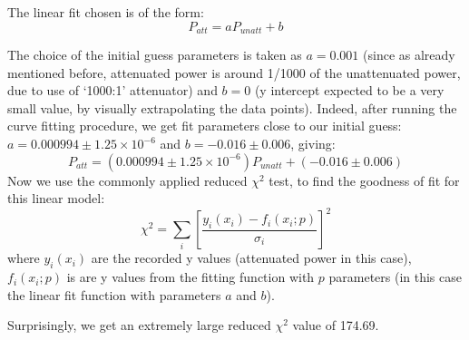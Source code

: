 The linear fit chosen is of the form: 
\begin{equation}
P_{att}=aP_{unatt}+b
\end{equation}

The choice of the initial guess parameters is taken as $a=0.001$ (since as already mentioned before, attenuated power is around 1/1000 of the unattenuated power, due to use of `1000:1' attenuator) and $b=0$ (y intercept expected to be a very small value, by visually extrapolating the data points). Indeed, after running the curve fitting procedure, we get fit parameters close to our initial guess: $a=0.000994\pm 1.25\times 10^{-6}$ and $b=-0.016\pm 0.006$, giving: $$P_{att}=(0.000994\pm 1.25\times 10^{-6})P_{unatt}+(-0.016\pm 0.006)$$
Now we use the commonly applied reduced $\chi^{2}$ test, to find the goodness of fit for this linear model: 
\begin{equation}
\chi^{2}=\sum_{i}\left[\dfrac{y_{i}(x_{i})-f_{i}(x_{i};p)}{\sigma_{i}}\right]^{2}
\end{equation}
where $y_{i}(x_{i})$ are the recorded y values (attenuated power in this case), $f_{i}(x_{i};p)$ is are y values from the fitting function with $p$ parameters (in this case the linear fit function with parameters $a$ and $b$).

Surprisingly, we get an extremely large reduced $\chi^{2}$ value of 174.69. 